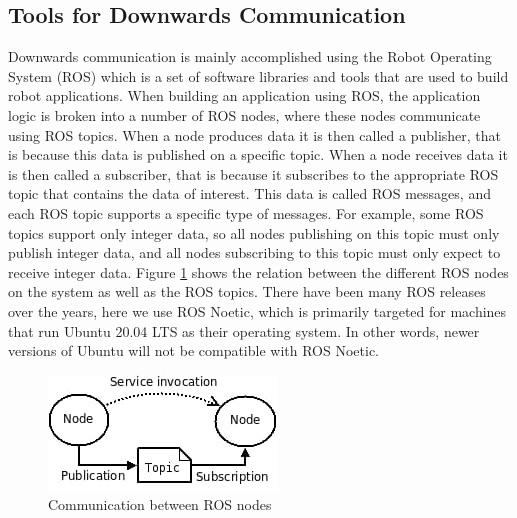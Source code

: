 \subsection{Tools for Downwards Communication}
Downwards communication is mainly accomplished using the Robot Operating System (ROS) which is a set of software libraries and tools that are used to build robot applications\cite{ros_documentation}. When building an application using ROS, the application logic is broken into a number of ROS nodes, where these nodes communicate using ROS topics. When a node produces data it is then called a publisher, that is because this data is published on a specific topic. When a node receives data it is then called a subscriber, that is because it subscribes to the appropriate ROS topic that contains the data of interest. This data is called ROS messages, and each ROS topic supports a specific type of messages. For example, some ROS topics support only integer data, so all nodes publishing on this topic must only publish integer data, and all nodes subscribing to this topic must only expect to receive integer data. Figure \ref{fig:ros_arch_official} shows the relation between the different ROS nodes on the system as well as the ROS topics\cite{ros_documentation}. There have been many ROS releases over the years, here we use ROS Noetic, which is primarily targeted for machines that run Ubuntu 20.04 LTS as their operating system. In other words, newer versions of Ubuntu will not be compatible with ROS Noetic.
\begin{figure}[ht]
	\centering
	\includegraphics{./Figures/CentralProcessingNode/UsedToolsAndFrameworks/Ros-images/ros-arch-official.jpeg}
	\caption{Communication between ROS nodes}
	\label{fig:ros_arch_official}
\end{figure}


